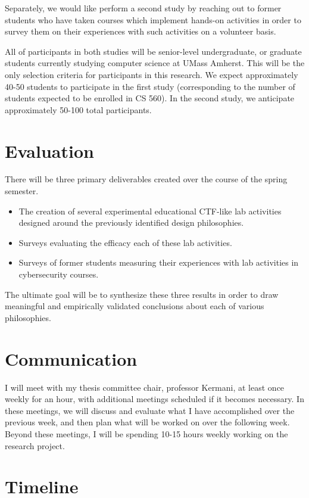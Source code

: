 \documentclass{article}
\begin{document}
    Separately, we would like perform a second study by reaching out to former students who have taken courses which implement hands-on activities in order to survey them on their experiences with such activities on a volunteer basis. 

    All of participants in both studies will be senior-level undergraduate, or graduate students currently studying computer science at UMass Amherst. 
    This will be the only selection criteria for participants in this research. 
    We expect approximately 40-50 students to participate in the first study (corresponding to the number of students expected to be enrolled in CS 560).
    In the second study, we anticipate approximately 50-100 total participants. 

\section{Evaluation}

    There will be three primary deliverables created over the course of the spring semester.

    \begin{itemize}
        \item The creation of several experimental educational CTF-like lab activities designed around the previously identified design philosophies. 
        \item Surveys evaluating the efficacy each of these lab activities.\
        \item Surveys of former students measuring their experiences with lab activities in cybersecurity courses. 
    \end{itemize}

    The ultimate goal will be to synthesize these three results in order to draw meaningful and empirically validated conclusions about each of various philosophies.
    

\section{Communication}

    I will meet with my thesis committee chair, professor Kermani, at least once weekly for an hour, with additional meetings scheduled if it becomes necessary. 
    In these meetings, we will discuss and evaluate what I have accomplished over the previous week, and then plan what will be worked on over the following week. 
    Beyond these meetings, I will be spending 10-15 hours weekly working on the research project. %
    
\section{Timeline}

\end{document}
